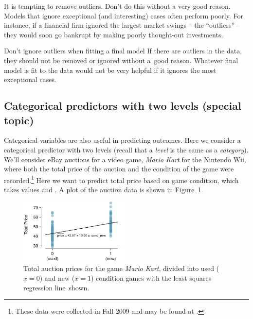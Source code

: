 It is tempting to remove outliers. Don't do this without a very good reason. Models that ignore exceptional (and interesting) cases often perform poorly. For instance, if a financial firm ignored the largest market swings -- the ``outliers'' --  they would soon go bankrupt by making poorly thought-out investments.

\begin{onebox}{Don't ignore outliers when fitting a final model}
{If there are outliers in the data, they should not be removed or ignored without a~good reason. Whatever final model is fit to the data would not be very helpful if it ignores the most exceptional cases.}
\end{onebox}


\D{\newpage}

\subsection{Categorical predictors with two levels (special topic)}
\label{categoricalPredictorsWithTwoLevels}
Categorical variables are also useful in predicting outcomes. Here we consider a categorical predictor with two levels (recall that a \emph{level} is the same as a \emph{category}). We'll consider eBay auctions for a video game, \emph{Mario Kart} for the Nintendo Wii, where both the total price of the auction and the condition of the game were recorded.\footnote{These data were collected in Fall 2009 and may be found at .} Here we want to predict total price based on game condition, which takes values  and . A plot of the auction data is shown in Figure~\ref{marioKartNewUsed}.

\begin{figure}[h]
\centering
\includegraphics[width=0.49\textwidth]{ch_regr_simple_linear/figures/marioKartNewUsed/marioKartNewUsed}
\caption{Total auction prices for the game \emph{Mario Kart}, divided into used ($x=0$) and new ($x=1$) condition games with the least squares regression line~shown.}
\label{marioKartNewUsed}
\end{figure}

